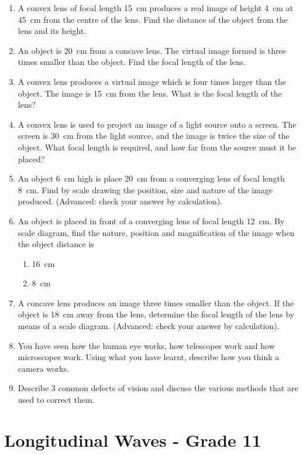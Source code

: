 \begin{enumerate}
\item A convex lens of focal length 15~cm produces a real image of height 4~cm at 45~cm from the centre of the lens. Find the distance of the object from the lens and its height.
\item An object is 20~cm from a concave lens. The virtual image formed is three times smaller than the object. Find the focal length of the lens.
\item A convex lens produces a virtual image which is four times larger than the object. The image is 15~cm from the lens. What is the focal length of the lens?
\item A convex lens is used to project an image of a light source onto a screen. The screen is 30~cm from the light source, and the image is twice the size of the object. What focal length is required, and how far from the source must it be placed?
\item An object 6~cm high is place 20~cm from a converging lens of focal length 8~cm. Find by scale drawing the position, size and nature of the image produced. (Advanced: check your answer by calculation).
\item An object is placed in front of a converging lens of focal length 12~cm. By scale diagram, find the nature, position and magnification of the image when the object distance is 
\begin{enumerate}
\item 16~cm
\item 8~cm
\end{enumerate}
\item A concave lens produces an image three times smaller than the object. If the object is 18~cm away from the lens, determine the focal length of the lens by means of a scale diagram. (Advanced: check your answer by calculation).
\item You have seen how the human eye works, how telescopes work and how microscopes work. Using what you have learnt, describe how you think a camera works.
\item Describe 3 common defects of vision and discuss the various methods that are used to correct them.

\end{enumerate}






\chapter{Longitudinal Waves - Grade 11}
\label{p:wsl:lw11}

